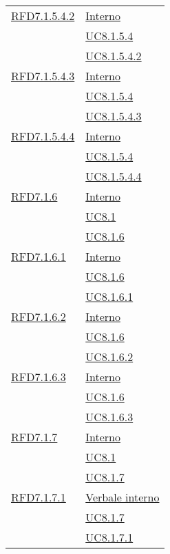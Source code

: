 \begin{longtable}{|>{\centering}m{5cm}|m{5cm}<{\centering}|}
\hyperlink{RFD7.1.5.4.2}{RFD7.1.5.4.2} & \hyperlink{Interno}{Interno}\\
& \hyperref[UC8.1.5.4]{UC8.1.5.4}\\
& \hyperref[UC8.1.5.4.2]{UC8.1.5.4.2}\\ \hline

\hyperlink{RFD7.1.5.4.3}{RFD7.1.5.4.3} & \hyperlink{Interno}{Interno}\\
& \hyperref[UC8.1.5.4]{UC8.1.5.4}\\
& \hyperref[UC8.1.5.4.3]{UC8.1.5.4.3}\\ \hline

\hyperlink{RFD7.1.5.4.4}{RFD7.1.5.4.4} & \hyperlink{Interno}{Interno}\\
& \hyperref[UC8.1.5.4]{UC8.1.5.4}\\
& \hyperref[UC8.1.5.4.4]{UC8.1.5.4.4}\\ \hline

\hyperlink{RFD7.1.6}{RFD7.1.6} & \hyperlink{Interno}{Interno}\\
& \hyperref[UC8.1]{UC8.1}\\
& \hyperref[UC8.1.6]{UC8.1.6}\\ \hline

\hyperlink{RFD7.1.6.1}{RFD7.1.6.1} & \hyperlink{Interno}{Interno}\\
& \hyperref[UC8.1.6]{UC8.1.6}\\
& \hyperref[UC8.1.6.1]{UC8.1.6.1}\\ \hline

\hyperlink{RFD7.1.6.2}{RFD7.1.6.2} & \hyperlink{Interno}{Interno}\\
& \hyperref[UC8.1.6]{UC8.1.6}\\
& \hyperref[UC8.1.6.2]{UC8.1.6.2}\\ \hline

\hyperlink{RFD7.1.6.3}{RFD7.1.6.3} & \hyperlink{Interno}{Interno}\\
& \hyperref[UC8.1.6]{UC8.1.6}\\
& \hyperref[UC8.1.6.3]{UC8.1.6.3}\\ \hline

\hyperlink{RFD7.1.7}{RFD7.1.7} & \hyperlink{Interno}{Interno}\\
& \hyperref[UC8.1]{UC8.1}\\
& \hyperref[UC8.1.7]{UC8.1.7}\\ \hline

\hyperlink{RFD7.1.7.1}{RFD7.1.7.1} & \hyperlink{Verbale interno}{Verbale interno}\\
& \hyperref[UC8.1.7]{UC8.1.7}\\
& \hyperref[UC8.1.7.1]{UC8.1.7.1}\\ \hline


\end{longtable}
